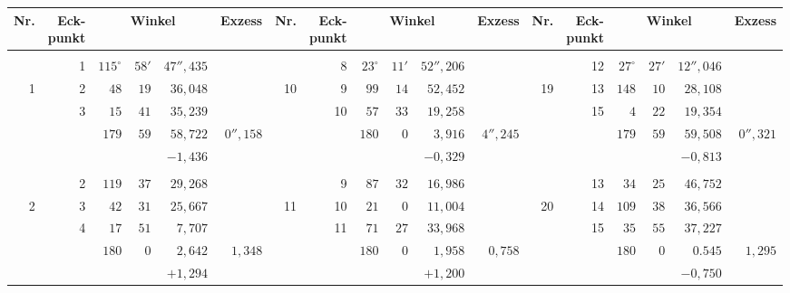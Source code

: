 \begin{center}
\begingroup
\fontsize{7.6}{9.2}\selectfont
\setlength{\tabcolsep}{2.1pt}
\renewcommand{\arraystretch}{1.04}
\begin{tabular}{|r|r|r@{\;}r@{\;}r|r||r|r|r@{\;}r@{\;}r|r||r|r|r@{\;}r@{\;}r|r|}
\hline
Nr.&\shortstack{\rule{0pt}{2.5ex}Eck-\\punkt}&\multicolumn{3}{c|}{Winkel}&Exzess & Nr.&\shortstack{\rule{0pt}{2.5ex}Eck-\\punkt}&\multicolumn{3}{c|}{Winkel}&Exzess & Nr.&\shortstack{\rule{0pt}{2.5ex}Eck-\\punkt}&\multicolumn{3}{c|}{Winkel}&Exzess\\ \hline
 &  &  &  &  &  &  &  &  &  &  &  &  &  &  &  &  & \\
 & 1 & $115^\circ$ & $58'$ & $47''{,}435$ &  &  & 8 & $23^\circ$ & $11'$ & $52''{,}206$ &  &  & 12 & $27^\circ$ & $27'$ & $12''{,}046$ & \\
1 & 2 & $48$ & $19$ & $36{,}048$ &  & 10 & 9 & $99$ & $14$ & $52{,}452$ &  & 19 & 13 & $148$ & $10$ & $28{,}108$ & \\
 & 3 & $15$ & $41$ & $35{,}239$ &  &  & 10 & $57$ & $33$ & $19{,}258$ &  &  & 15 & $4$ & $22$ & $19{,}354$ & \\
\cline{3-5}\cline{9-11}\cline{15-17}
 &  & $179$ & $59$ & $58{,}722$ & $0''{,}158$ &  &  & $180$ & $0$ & $3{,}916$ & $4''{,}245$ &  &  & $179$ & $59$ & $59{,}508$ & $0''{,}321$\\
 &  & \multicolumn{3}{r|}{$-1{,}436$} &  &  &  & \multicolumn{3}{r|}{$-0{,}329$} &  &  &  & \multicolumn{3}{r|}{$-0{,}813$} & \\
 &  &  &  &  &  &  &  &  &  &  &  &  &  &  &  &  & \\
 & 2 & $119$ & $37$ & $29{,}268$ &  &  & 9 & $87$ & $32$ & $16{,}986$ &  &  & 13 & $34$ & $25$ & $46{,}752$ & \\
2 & 3 & $42$ & $31$ & $25{,}667$ &  & 11 & 10 & $21$ & $0$ & $11{,}004$ &  & 20 & 14 & $109$ & $38$ & $36{,}566$ & \\
 & 4 & $17$ & $51$ & $7{,}707$ &  &  & 11 & $71$ & $27$ & $33{,}968$ &  &  & 15 & $35$ & $55$ & $37{,}227$ & \\
\cline{3-5}\cline{9-11}\cline{15-17}
 &  & $180$ & $0$ & $2{,}642$ & $1{,}348$ &  &  & $180$ & $0$ & $1{,}958$ & $0{,}758$ &  &  & $180$ & $0$ & $0{.}545$ & $1{,}295$\\
 &  & \multicolumn{3}{r|}{$+1{,}294$} &  &  &  & \multicolumn{3}{r|}{$+1{,}200$} &  &  &  & \multicolumn{3}{r|}{$-0{,}750$} & \\

\end{tabular}
\end{center}
